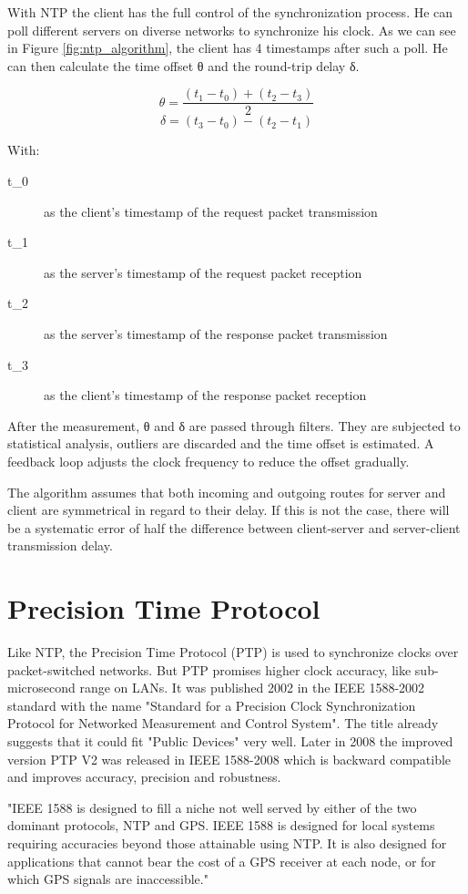 With NTP the client has the full control of the synchronization process. He can poll different servers on diverse networks to synchronize his clock. As we can see in Figure \ref{fig:ntp_algorithm}, the client has 4 timestamps after such a poll. He can then calculate the time offset θ and the round-trip delay δ.

\[ \theta = \frac{(t_1 - t_0) + (t_2 - t_3)}{2} \]
\[ \delta = (t_3 - t_0) - (t_2 - t_1) \]

With:
\begin{description}
    \item[t_0] as the client's timestamp of the request packet transmission
    \item[t_1] as the server's timestamp of the request packet reception
    \item[t_2] as the server's timestamp of the response packet transmission
    \item[t_3] as the client's timestamp of the response packet reception
\end{description}

After the measurement, θ and δ are passed through filters. They are subjected to statistical analysis, outliers are discarded and the time offset is estimated. A feedback loop adjusts the clock frequency to reduce the offset gradually.

The algorithm assumes that both incoming and outgoing routes for server and client are symmetrical in regard to their delay. If this is not the case, there will be a systematic error of half the difference between client-server and server-client transmission delay.

\section{Precision Time Protocol}

Like NTP, the Precision Time Protocol (PTP) is used to synchronize clocks over packet-switched networks. But PTP promises higher clock accuracy, like sub-microsecond range on LANs. It was published 2002 in the IEEE 1588-2002 standard with the name "Standard for a Precision Clock Synchronization Protocol for Networked Measurement and Control System". The title already suggests that it could fit "Public Devices" very well. Later in 2008 the improved version PTP V2 was released in IEEE 1588-2008 which is backward compatible and improves accuracy, precision and robustness.

"IEEE 1588 is designed to fill a niche not well served by either of the two dominant protocols, NTP and GPS. IEEE 1588 is designed for local systems requiring accuracies beyond those attainable using NTP. It is also designed for applications that cannot bear the cost of a GPS receiver at each node, or for which GPS signals are inaccessible."

